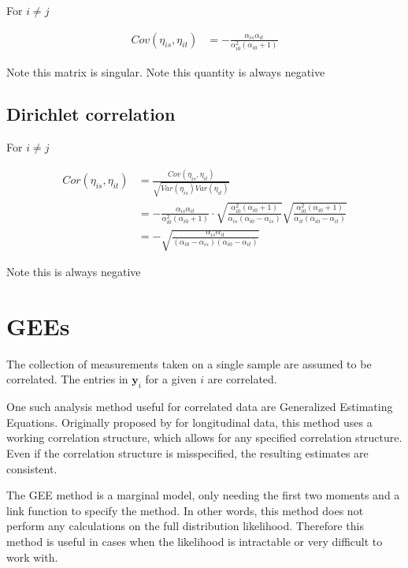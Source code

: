\documentclass[10pt]{article}
\theoremstyle{definition}
\begin{document}
For $i \neq j$

\begin{align*}
  Cov(\eta_{is}, \eta_{it}) &=  - \frac{\alpha_{is}\alpha_{it}}{\alpha_{i0}^2(\alpha_{i0} + 1)}
\end{align*}


Note this matrix is singular.
Note this quantity is always negative

\subsection{Dirichlet correlation }

For $i \neq j$

\begin{align*}
  Cor(\eta_{is}, \eta_{it}) &= \frac{Cov(\eta_{is}, \eta_{it})}{\sqrt{Var(\eta_{is})Var(\eta_{it})}}\\
  &= -  \frac{\alpha_{is}\alpha_{it}}{\alpha_{i0}^2(\alpha_{i0} + 1)} \cdot \sqrt{\frac{\alpha_{i0}^2(\alpha_{i0} + 1)}{\alpha_{is}(\alpha_{i0} - \alpha_{is})}}\sqrt{\frac{\alpha_{i0}^2(\alpha_{i0} + 1)}{\alpha_{it}(\alpha_{i0} - \alpha_{it})}}\\
  &= - \sqrt{\frac{\alpha_{is}\alpha_{it}}{(\alpha_{i0} - \alpha_{is})(\alpha_{i0} - \alpha_{it})}}
\end{align*}


Note this is always negative

\section{GEEs }

The collection of measurements taken on a single sample are assumed to be correlated. The entries in $\mathbf{y}_{i}$ for a given $i$ are correlated.

One such analysis method useful for correlated data are Generalized Estimating Equations. Originally proposed by \cite{liang1986} for longitudinal data, this method uses a working correlation structure, which allows for any specified correlation structure. Even if the correlation structure is misspecified, the resulting estimates are consistent.

The GEE method is a marginal model, only needing the first two moments and a link function to specify the method. In other words, this method does not perform any calculations on the full distribution likelihood. Therefore this method is useful in cases when the likelihood is intractable or very difficult to work with.
\end{document}
